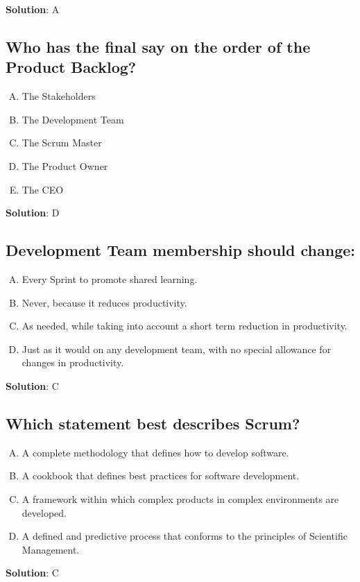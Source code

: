 \textbf{Solution}: A


\subsection{Who has the final say on the order of the Product Backlog?}
\begin{enumerate}[A)]
  \item The Stakeholders
  \item The Development Team
  \item The Scrum Master
  \item The Product Owner
  \item The CEO
\end{enumerate}


\textbf{Solution}: D


\subsection{Development Team membership should change:}
\begin{enumerate}[A)]
  \item Every Sprint to promote shared learning.
  \item Never, because it reduces productivity.
  \item As needed, while taking into account a short term reduction in productivity.
  \item Just as it would on any development team, with no special allowance for changes in productivity.
\end{enumerate}


\textbf{Solution}: C


\subsection{Which statement best describes Scrum?}
\begin{enumerate}[A)]
  \item A complete methodology that defines how to develop software.
  \item A cookbook that defines best practices for software development.
  \item A framework within which complex products in complex environments are developed.
  \item A defined and predictive process that conforms to the principles of Scientific Management.
\end{enumerate}


\textbf{Solution}: C


